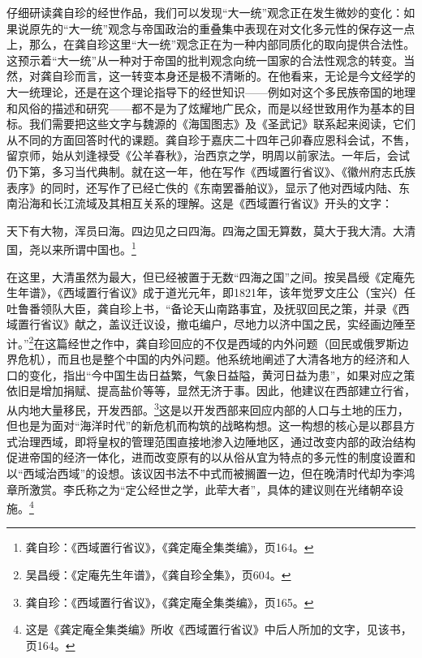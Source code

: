 \documentclass[a4paper, 12pt, openright]{ctexbook}
\renewenvironment{quote}
  {\list{}{\rightmargin2\ccwd \leftmargin2\ccwd \itemindent=2\ccwd \listparindent=2\ccwd}%
   \item\relax\small\kaishu\color{black}}
  {\endlist}
\begin{document}
仔细研读龚自珍的经世作品，我们可以发现“大一统”观念正在发生微妙的变化：如果说原先的“大一统”观念与帝国政治的重叠集中表现在对文化多元性的保存这一点上，那么，在龚自珍这里“大一统”观念正在为一种内部同质化的取向提供合法性。这预示着“大一统”从一种对于帝国的批判观念向统一国家的合法性观念的转变。当然，对龚自珍而言，这一转变本身还是极不清晰的。在他看来，无论是今文经学的大一统理论，还是在这个理论指导下的经世知识——例如对这个多民族帝国的地理和风俗的描述和研究——都不是为了炫耀地广民众，而是以经世致用作为基本的目标。我们需要把这些文字与魏源的《海国图志》及《圣武记》联系起来阅读，它们从不同的方面回答时代的课题。龚自珍于嘉庆二十四年己卯春应恩科会试，不售，留京师，始从刘逢禄受《公羊春秋》，治西京之学，明周以前家法。一年后，会试仍下第，多习当代典制。就在这一年，他在写作《西域置行省议》、《徽州府志氏族表序》的同时，还写作了已经亡佚的《东南罢番舶议》，显示了他对西域内陆、东南沿海和长江流域及其相互关系的理解。这是《西域置行省议》开头的文字：

\begin{quote}
天下有大物，浑员曰海。四边见之曰四海。四海之国无算数，莫大于我大清。大清国，尧以来所谓中国也。\footnote{龚自珍：《西域置行省议》，《龚定庵全集类编》，页164。}
\end{quote}

在这里，大清虽然为最大，但已经被置于无数“四海之国”之间。按吴昌绶《定庵先生年谱》，《西域置行省议》成于道光元年，即1821年，该年觉罗文庄公（宝兴）任吐鲁番领队大臣，龚自珍上书，“备论天山南路事宜，及抚驭回民之策，并录《西域置行省议》献之，盖议迁议设，撤屯编户，尽地力以济中国之民，实经画边陲至计。”\footnote{吴昌绶：《定庵先生年谱》，《龚自珍全集》，页604。}在这篇经世之作中，龚自珍回应的不仅是西域的内外问题（回民或俄罗斯边界危机），而且也是整个中国的内外问题。他系统地阐述了大清各地方的经济和人口的变化，指出“今中国生齿日益繁，气象日益隘，黄河日益为患”，如果对应之策依旧是增加捐赋、提高盐价等等，显然无济于事。因此，他建议在西部建立行省，从内地大量移民，开发西部。\footnote{龚自珍：《西域置行省议》，《龚定庵全集类编》，页165。}这是以开发西部来回应内部的人口与土地的压力，但也是为面对“海洋时代”的新危机而构筑的战略构想。这一构想的核心是以郡县方式治理西域，即将皇权的管理范围直接地渗入边陲地区，通过改变内部的政治结构促进帝国的经济一体化，进而改变原有的以从俗从宜为特点的多元性的制度设置和以“西域治西域”的设想。该议因书法不中式而被搁置一边，但在晚清时代却为李鸿章所激赏。李氏称之为“定公经世之学，此荦大者”，具体的建议则在光绪朝卒设施。\footnote{这是《龚定庵全集类编》所收《西域置行省议》中后人所加的文字，见该书，页164。}
\end{document}

